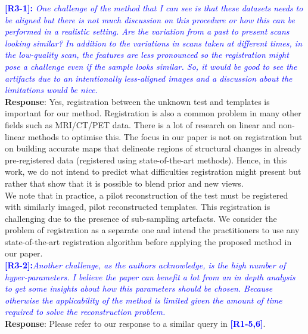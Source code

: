 \documentclass[11pt]{article}
\begin{document}
\vspace{0.5cm}\textcolor{blue}{\textbf{[R3-1]:} \textit{One challenge of the method that I can see is that these datasets needs to be aligned but there is not much discussion on this procedure or how this can be performed in a realistic setting. Are the variation from a past to present scans looking similar? In addition to the variations in scans taken at different times, in the low-quality scan, the features are less pronounced so the registration might pose a challenge even if the sample looks similar. So, it would be good to see the artifacts due to an intentionally less-aligned images and a discussion about the limitations would be nice.
}}\\

\textbf{Response}: Yes, registration between the unknown test and templates is important for our method. Registration is also a common problem in many other fields such as MRI/CT/PET data.  There is a lot of research on linear and non-linear methods to optimise this. The focus in our paper is not on registration but on building accurate maps that delineate regions of structural changes in already pre-registered data (registered using state-of-the-art methods).  Hence, in this work, we do not intend to predict what difficulties registration might present but rather that show that it is possible to blend prior and new views.\\

We note that in practice, a pilot reconstruction of the test must be registered with similarly imaged, pilot reconstructed templates. This registration is challenging due to the presence of sub-sampling artefacts. We consider the problem of registration as a separate one and intend the practitioners to use any state-of-the-art registration algorithm before applying the proposed method in our paper. 
\\

\vspace{0.5cm}\textcolor{blue}{\textbf{[R3-2]:}\textit{Another challenge, as the authors acknowledge, is the high number of hyper-parameters. I believe the paper can benefit a lot from an in depth analysis to get some insights about how this parameters should be chosen. Because otherwise the applicability of the method is limited given the amount of time required to solve the reconstruction problem.
}}\\

\textbf{Response}: Please refer to our response to a similar query in \textcolor{blue}{\textbf{[R1-5,6]}}.\\
\end{document}
